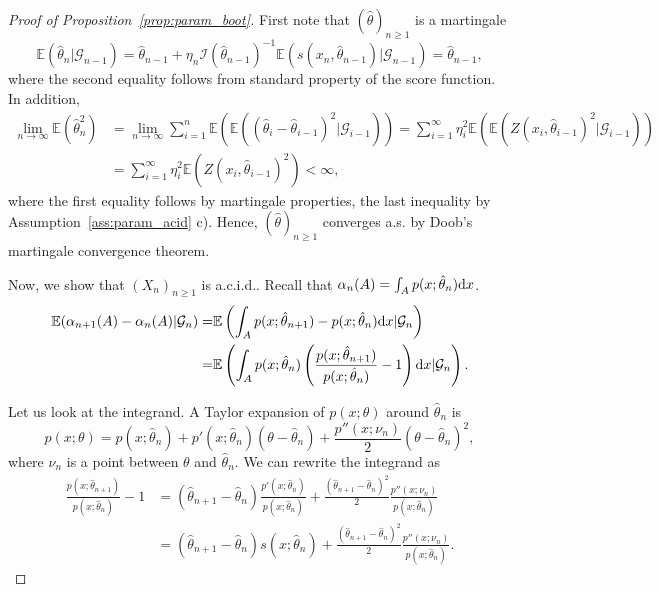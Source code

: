 \documentclass{article}
\theoremstyle{definition}
\newcommand{\di}{{\rm d}}
\renewcommand{\&}{and}
\begin{document}
\begin{proof}[Proof of Proposition~\ref{prop:param_boot}] First note that $(\hat{\theta})_{n\geq 1}$ is a martingale
\[
\mathbb{E}(\hat{\theta}_n| \mathcal{G}_{n-1}) = \hat{\theta}_{n-1} + \eta_n \mathcal{I}(\hat{\theta}_{n-1})^{-1} \mathbb{E}( s(x_n, \hat{\theta}_{n-1})| \mathcal{G}_{n-1}) = \hat{\theta}_{n-1},
\]  
where the second equality follows from standard property of the score function. In addition, 
\begin{align*}
\lim_{n \to \infty} \mathbb{E}(\hat{\theta}^2_n) & = \lim_{n \to \infty} \sum_{i=1}^n \mathbb{E}(\mathbb{E}((\hat{\theta}_i-\hat{\theta}_{i-1})^2| \mathcal{G}_{i-1}))= \sum_{i=1}^\infty \eta^2_i \mathbb{E}(\mathbb{E}(Z(x_i, \hat{\theta}_{i-1})^2| \mathcal{G}_{i-1})) \\
& = \sum_{i=1}^\infty \eta^2_i \mathbb{E}( Z(x_i, \hat{\theta}_{i-1})^2) <\infty,
\end{align*}
where the first equality follows by martingale properties, the last inequality by Assumption~\ref{ass:param_acid} c). Hence, $(\hat{\theta})_{n\geq 1}$ converges a.s. by Doob's martingale convergence theorem. 

\noindent Now, we show that $(X_n)_{n \geq 1}$ is a.c.i.d.. Recall that $\alpha_{n}(A) = \int_{A} p(x;\hat{\theta}_{n})\di x$. 
\begin{align}\label{eq:param1}
  \mathbb{E}(\alpha_{n+1}(A) -\alpha_{n}(A)  | \mathcal{G}_{n}) =& \mathbb{E}\left( 
  \int_{A} p(x;\hat{\theta}_{n+1})  - p(x;\hat{\theta}_{n})\di x| \mathcal{G}_{n}\right)\nonumber \\ 
  =  &  \mathbb{E}\left( 
  \int_{A}p(x;\hat{\theta}_{n}) \left( \frac{p(x;\hat{\theta}_{n+1}) }{p(x;\hat{\theta}_{n})}-1\right)\di x| \mathcal{G}_{n}\right).
\end{align}

\noindent Let us look at the integrand. A Taylor expansion of $p(x;\theta)$ around $\hat{\theta}_{n}$ is 
\[
p(x;\theta)= p(x;\hat{\theta}_{n}) + p'(x;\hat{\theta}_{n}) (\theta - \hat{\theta}_{n}) + \frac{p''(x;\nu_n)}{2}(\theta - \hat{\theta}_{n})^2,
\]
where $\nu_n$ is a point between $\theta$ and $\hat{\theta}_{n}$. We can rewrite the integrand as 
\begin{align*}
\frac{p(x;\hat{\theta}_{n+1}) }{p(x;\hat{\theta}_{n})}-1 &=(\hat{\theta}_{n+1}-\hat{\theta}_{n})  \frac{p'(x;\hat{\theta}_{n})}{p(x;\hat{\theta}_{n})}+ \frac{(\hat{\theta}_{n+1}-\hat{\theta}_{n})^2}{2}\frac{p''(x;\nu_{n})}{p(x;\hat{\theta}_{n})} \\
&= (\hat{\theta}_{n+1}-\hat{\theta}_{n}) s(x;\hat{\theta}_{n}) + \frac{(\hat{\theta}_{n+1}-\hat{\theta}_{n})^2}{2}\frac{p''(x;\nu_{n})}{p(x;\hat{\theta}_{n})}.
\end{align*}



\end{proof}
\end{document}
